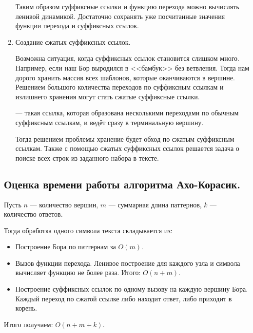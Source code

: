 \begin{enumerate}
\begin{figure}[H]
\begin{center}
               \end{center}
       \end{figure}
       Таким образом суффиксные ссылки и функцию перехода можно вычислять ленивой динамикой.
       Достаточно сохранять уже посчитанные значения функции перехода и суффиксных ссылок.
       \item Создание сжатых суффиксных ссылок.

        Возможна ситуация, когда суффиксных ссылок становится слишком много. Например, если наш Бор
        выродился в <<бамбук>> без ветвления. Тогда нам дорого хранить массив всех шаблонов, которые
        оканчиваются в вершине. Решением большого количества переходов по суффиксным ссылкам и излишнего
        хранения могут стать сжатые суффиксные ссылки.
        \begin{definition}
                 --- такая ссылка, которая образована несколькими
                переходами по обычным суффиксным ссылкам, и ведёт сразу в терминальную вершину.
        \end{definition}
        Тогда решением проблемы хранение будет обход по сжатым суффиксным ссылкам. 
        Также с помощью сжатых суффиксных ссылок решается задача о поиске всех строк из
        заданного набора в тексте.
\end{enumerate}

\subsection{Оценка времени работы алгоритма Ахо-Корасик.}
Пусть $n$ --- количество вершин, $m$ --- суммарная длина паттернов, $k$ --- количество ответов.

Тогда обработка одного символа текста складывается из:
\begin{itemize}
        \item Построение Бора по паттернам за $O(m)$.
        \item Вызов функции перехода. Ленивое построение для каждого узла и символа вычисляет функцию
        не более раза. Итого: $O(n + m)$.
        \item Построение суффиксных ссылок по одному вызову на каждую вершину Бора.
        Каждый переход по сжатой ссылке либо находит ответ, либо приходит в корень.
\end{itemize}
Итого получаем: $O(n + m + k)$.
